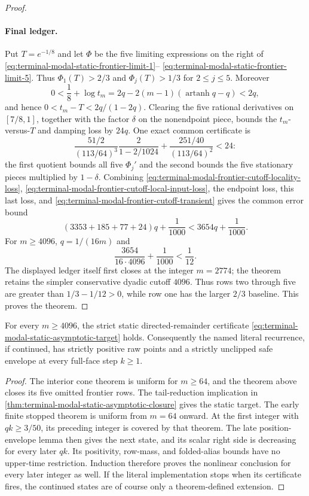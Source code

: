 \begin{proof}
\paragraph{Final ledger.}
Put $T=e^{-1/8}$ and let $\Phi$ be the five limiting expressions on the
right of \eqref{eq:terminal-modal-static-frontier-limit-1}--
\eqref{eq:terminal-modal-static-frontier-limit-5}.  Thus
$\Phi_1(T)>2/3$ and $\Phi_j(T)>1/3$ for $2\le j\le5$.
Moreover
\[
 0<\frac18+\log t_m
 =2q-2(m-1)(\operatorname{artanh}q-q)<2q,
\]
and hence $0<t_m-T<2q/(1-2q)$.  Clearing the five rational derivatives on
$[7/8,1]$, together with the factor $\delta$ on the nonendpoint piece,
bounds the $t_m$-versus-$T$ and damping loss by $24q$.  One exact common
certificate is
\[
 \frac{51/2}{(113/64)^3}\frac{2}{1-2/1024}
 +\frac{251/40}{(113/64)^2}<24:
\]
the first quotient bounds all five $\Phi_j'$ and the second bounds the five
stationary pieces multiplied by $1-\delta$.  Combining
\eqref{eq:terminal-modal-frontier-cutoff-locality-loss},
\eqref{eq:terminal-modal-frontier-cutoff-local-input-loss}, the endpoint
loss, this last loss, and \eqref{eq:terminal-modal-frontier-cutoff-transient}
gives the common error bound
\[
 (3353+185+77+24)q+\frac1{1000}
 <3654q+\frac1{1000}.
\]
For $m\ge4096$, $q=1/(16m)$ and
\[
 \frac{3654}{16\cdot4096}+\frac1{1000}<\frac1{12}.
\]
The displayed ledger itself first closes at the integer $m=2774$; the theorem
retains the simpler conservative dyadic cutoff $4096$.
Thus rows two through five are greater than $1/3-1/12>0$, while row one
has the larger $2/3$ baseline.  This proves the theorem.
\end{proof}

\begin{corollary}
\label{cor:terminal-modal-static-regime-cutoff}
For every $m\ge4096$, the strict static directed-remainder certificate
\eqref{eq:terminal-modal-static-asymptotic-target} holds.  Consequently the
named literal recurrence, if continued, has strictly positive raw points and
a strictly unclipped safe envelope at every full-face step $k\ge1$.
\end{corollary}

\begin{proof}
The interior cone theorem is uniform for $m\ge64$, and the theorem above
closes its five omitted frontier rows.  The tail-reduction implication in
\cref{thm:terminal-modal-static-asymptotic-closure} gives the static target.
The early finite stopped theorem is uniform from $m=64$ onward.  At the first
integer with $qk\ge3/50$, its preceding integer is covered by that theorem.
The late position-envelope lemma then gives the next state, and its scalar
right side is decreasing for every later $qk$.  Its positivity, row-mass, and
folded-alias bounds have no upper-time restriction.  Induction therefore
proves the nonlinear conclusion for every later integer as well.  If the
literal implementation stops when its certificate fires, the continued
states are of course only a theorem-defined extension.
\end{proof}

